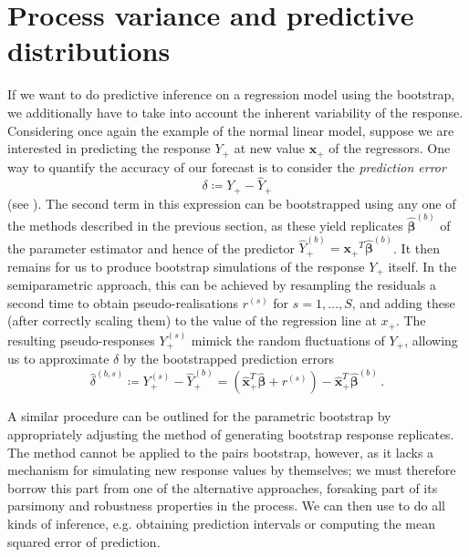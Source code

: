 \documentclass[a4paper]{book}
\begin{document}
\section{Process variance and predictive distributions} \label{sec:boot-proc}

If we want to do predictive inference on a regression model using the bootstrap, we additionally have to take into account the inherent variability of the response. Considering once again the example of the normal linear model, suppose we are interested in predicting the response $Y_+$ at new value $\mathbf{x_+}$ of the regressors. One way to quantify the accuracy of our forecast is to consider the \emph{prediction error}
\begin{equation}
  \delta \coloneqq Y_+ - \widehat{Y}_+
\end{equation}
(see \cite[Algorithm 6.4]{davison}). The second term in this expression can be bootstrapped using any one of the methods described in the previous section, as these yield replicates $\widehat{\bm{\beta}}^{(b)}$ of the parameter estimator and hence of the predictor $\widehat{Y}^{(b)}_+ = \mathbf{x_+}^T \widehat{\bm{\beta}}^{(b)}$. It then remains for us to produce bootstrap simulations of the response $Y_+$ itself. In the semiparametric approach, this can be achieved by resampling the residuals a second time to obtain pseudo-realisations $r^{(s)}$ for $s = 1, \dots, S$, and adding these (after correctly scaling them) to the value of the regression line at $x_+$. The resulting pseudo-responses $Y^{(s)}_+$ mimick the random fluctuations of $Y_+$, allowing us to approximate $\delta$ by the bootstrapped prediction errors
\begin{equation} \label{eq:pred-error-boot}
  \widehat{\delta}^{(b, s)} \coloneqq Y^{(s)}_+ - \widehat{Y}^{(b)}_+ = (\widehat{\mathbf{x}}^T_+ \widehat{\bm{\beta}} + r^{(s)}) - \widehat{\mathbf{x}}^T_+ \widehat{\bm{\beta}}^{(b)} \,.
\end{equation}

A similar procedure can be outlined for the parametric bootstrap by appropriately adjusting the method of generating bootstrap response replicates. The method cannot be applied to the pairs bootstrap, however, as it lacks a mechanism for simulating new response values by themselves; we must therefore borrow this part from one of the alternative approaches, forsaking part of its parsimony and robustness properties in the process. We can then use  to do all kinds of inference, e.g. obtaining prediction intervals or computing the mean squared error of prediction.
\end{document}
